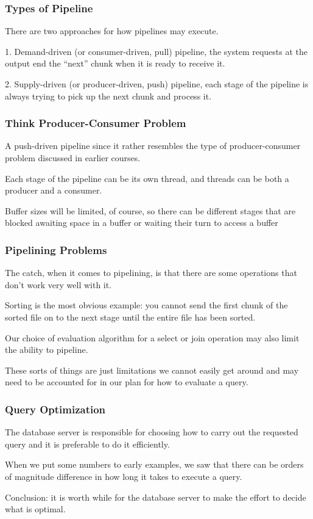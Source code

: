 \begin{frame}
\frametitle{Types of Pipeline}

There are two approaches for how pipelines may execute. 

1. Demand-driven (or consumer-driven, pull) pipeline, the system requests at the output end the ``next'' chunk when it is ready to receive it.

2. Supply-driven (or producer-driven, push) pipeline, each stage of the pipeline is always trying to pick up the next chunk and process it.

\end{frame}

\begin{frame}
\frametitle{Think Producer-Consumer Problem}

A push-driven pipeline since it rather resembles the type of producer-consumer problem discussed in earlier courses. 

Each stage of the pipeline can be its own thread, and threads can be both a producer and a consumer.

Buffer sizes will be limited, of course, so there can be different stages that are blocked awaiting space in a buffer or waiting their turn to access a buffer


\end{frame}

\begin{frame}
\frametitle{Pipelining Problems}

The catch, when it comes to pipelining, is that there are some operations that don't work very well with it. 

Sorting is the most obvious example: you cannot send the first chunk of the sorted file on to the next stage until the entire file has been sorted. 

Our choice of evaluation algorithm for a select or join operation may also limit the ability to pipeline. 

These sorts of things are just limitations we cannot easily get around and may need to be accounted for in our plan for how to evaluate a query.


\end{frame}

\begin{frame}
\frametitle{Query Optimization}

The database server is responsible for choosing how to carry out the requested query and it is preferable to do it efficiently.

When we put some numbers to early examples, we saw that there can be orders of magnitude difference in how long it takes to execute a query. 

Conclusion: it is worth while for the database server to make the effort to decide what is optimal.


\end{frame}

